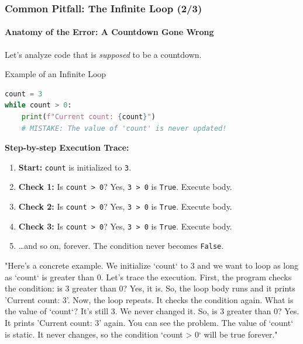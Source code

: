 \documentclass{beamer}
\begin{document}
\begin{frame}[fragile]
    \frametitle{Common Pitfall: The Infinite Loop (2/3)}
    \framesubtitle{Anatomy of the Error: A Countdown Gone Wrong}
    
    Let's analyze code that is \textit{supposed} to be a countdown.
    
    \begin{block}{Example of an Infinite Loop}
    \begin{lstlisting}[language=Python]
count = 3
while count > 0:
    print(f"Current count: {count}") 
    # MISTAKE: The value of 'count' is never updated!
    \end{lstlisting}
    \end{block}
    
    \textbf{Step-by-step Execution Trace:}
    \begin{enumerate}
        \item \textbf{Start:} \texttt{count} is initialized to \texttt{3}.
        \item \textbf{Check 1:} Is \texttt{count > 0}? Yes, \texttt{3 > 0} is \texttt{True}. Execute body.
        \item \textbf{Check 2:} Is \texttt{count > 0}? Yes, \texttt{3 > 0} is \texttt{True}. Execute body.
        \item \textbf{Check 3:} Is \texttt{count > 0}? Yes, \texttt{3 > 0} is \texttt{True}. Execute body.
        \item \dots and so on, forever. The condition never becomes \texttt{False}.
    \end{enumerate}

    \begin{note}
    "Here's a concrete example. We initialize `count` to 3 and we want to loop as long as `count` is greater than 0. Let's trace the execution.
    First, the program checks the condition: is 3 greater than 0? Yes, it is. So, the loop body runs and it prints 'Current count: 3'.
    Now, the loop repeats. It checks the condition again. What is the value of `count`? It's still 3. We never changed it. So, is 3 greater than 0? Yes. It prints 'Current count: 3' again.
    You can see the problem. The value of `count` is static. It never changes, so the condition `count > 0` will be true forever."
    \end{note}
\end{frame}
\end{document}
